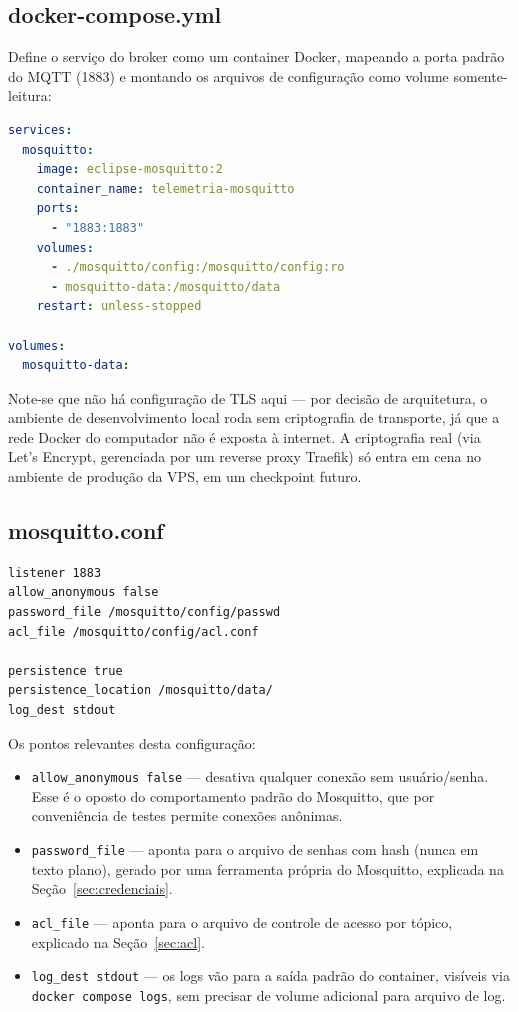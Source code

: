 \documentclass[11pt,a4paper]{article}
\begin{document}
\subsection{docker-compose.yml}

Define o serviço do broker como um container Docker, mapeando a porta padrão do MQTT (1883) e montando os arquivos de configuração como volume somente-leitura:

\begin{lstlisting}[language=yaml,caption={infra/docker-compose.yml}]
services:
  mosquitto:
    image: eclipse-mosquitto:2
    container_name: telemetria-mosquitto
    ports:
      - "1883:1883"
    volumes:
      - ./mosquitto/config:/mosquitto/config:ro
      - mosquitto-data:/mosquitto/data
    restart: unless-stopped

volumes:
  mosquitto-data:
\end{lstlisting}

Note-se que não há configuração de TLS aqui --- por decisão de arquitetura, o ambiente de desenvolvimento local roda sem criptografia de transporte, já que a rede Docker do computador não é exposta à internet. A criptografia real (via Let's Encrypt, gerenciada por um reverse proxy Traefik) só entra em cena no ambiente de produção da VPS, em um checkpoint futuro.

\subsection{mosquitto.conf}

\begin{lstlisting}[language=bash,caption={infra/mosquitto/config/mosquitto.conf}]
listener 1883
allow_anonymous false
password_file /mosquitto/config/passwd
acl_file /mosquitto/config/acl.conf

persistence true
persistence_location /mosquitto/data/
log_dest stdout
\end{lstlisting}

Os pontos relevantes desta configuração:

\begin{itemize}
    \item \texttt{allow\_anonymous false} --- desativa qualquer conexão sem usuário/senha. Esse é o oposto do comportamento padrão do Mosquitto, que por conveniência de testes permite conexões anônimas.
    \item \texttt{password\_file} --- aponta para o arquivo de senhas com hash (nunca em texto plano), gerado por uma ferramenta própria do Mosquitto, explicada na Seção~\ref{sec:credenciais}.
    \item \texttt{acl\_file} --- aponta para o arquivo de controle de acesso por tópico, explicado na Seção~\ref{sec:acl}.
    \item \texttt{log\_dest stdout} --- os logs vão para a saída padrão do container, visíveis via \texttt{docker compose logs}, sem precisar de volume adicional para arquivo de log.
\end{itemize}
\end{document}
